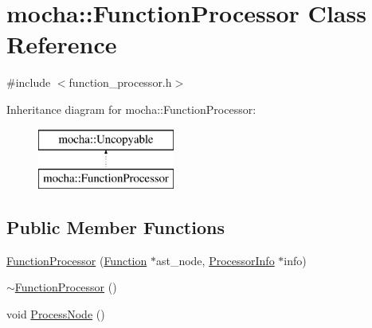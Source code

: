 \hypertarget{classmocha_1_1_function_processor}{
\section{mocha::FunctionProcessor Class Reference}
\label{classmocha_1_1_function_processor}
}


{\ttfamily \#include $<$function\_\-processor.h$>$}

Inheritance diagram for mocha::FunctionProcessor:\begin{figure}[H]
\begin{center}
\leavevmode
\includegraphics[height=2.000000cm]{classmocha_1_1_function_processor}
\end{center}
\end{figure}
\subsection*{Public Member Functions}
\begin{DoxyCompactItemize}
\item 
\hyperlink{classmocha_1_1_function_processor_aad99a004bfa81660b7c754b975967c00}{FunctionProcessor} (\hyperlink{classmocha_1_1_function}{Function} $\ast$ast\_\-node, \hyperlink{classmocha_1_1_processor_info}{ProcessorInfo} $\ast$info)
\item 
\hyperlink{classmocha_1_1_function_processor_a5a9e45f713c095b6068bc4ecc1e3b8a6}{$\sim$FunctionProcessor} ()
\item 
void \hyperlink{classmocha_1_1_function_processor_a8a926734a37f613ba1b63a965796ce7d}{ProcessNode} ()
\end{DoxyCompactItemize}
